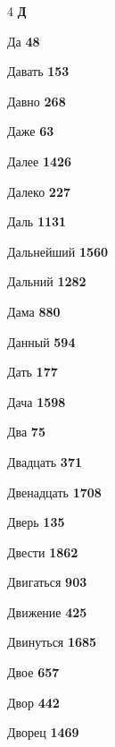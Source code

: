 \begin{multicols}{4}
\vspace{0.6em}\noindent\textbf{\normalsize\sffamily\color{primary} Д}\par\vspace{0.2em}
\noindent Да \dotfill \textbf{\color{secondary} 48}\par
\noindent Давать \dotfill \textbf{\color{secondary} 153}\par
\noindent Давно \dotfill \textbf{\color{secondary} 268}\par
\noindent Даже \dotfill \textbf{\color{secondary} 63}\par
\noindent Далее \dotfill \textbf{\color{secondary} 1426}\par
\noindent Далеко \dotfill \textbf{\color{secondary} 227}\par
\noindent Даль \dotfill \textbf{\color{secondary} 1131}\par
\noindent Дальнейший \dotfill \textbf{\color{secondary} 1560}\par
\noindent Дальний \dotfill \textbf{\color{secondary} 1282}\par
\noindent Дама \dotfill \textbf{\color{secondary} 880}\par
\noindent Данный \dotfill \textbf{\color{secondary} 594}\par
\noindent Дать \dotfill \textbf{\color{secondary} 177}\par
\noindent Дача \dotfill \textbf{\color{secondary} 1598}\par
\noindent Два \dotfill \textbf{\color{secondary} 75}\par
\noindent Двадцать \dotfill \textbf{\color{secondary} 371}\par
\noindent Двенадцать \dotfill \textbf{\color{secondary} 1708}\par
\noindent Дверь \dotfill \textbf{\color{secondary} 135}\par
\noindent Двести \dotfill \textbf{\color{secondary} 1862}\par
\noindent Двигаться \dotfill \textbf{\color{secondary} 903}\par
\noindent Движение \dotfill \textbf{\color{secondary} 425}\par
\noindent Двинуться \dotfill \textbf{\color{secondary} 1685}\par
\noindent Двое \dotfill \textbf{\color{secondary} 657}\par
\noindent Двор \dotfill \textbf{\color{secondary} 442}\par
\noindent Дворец \dotfill \textbf{\color{secondary} 1469}\par

\end{multicols}
